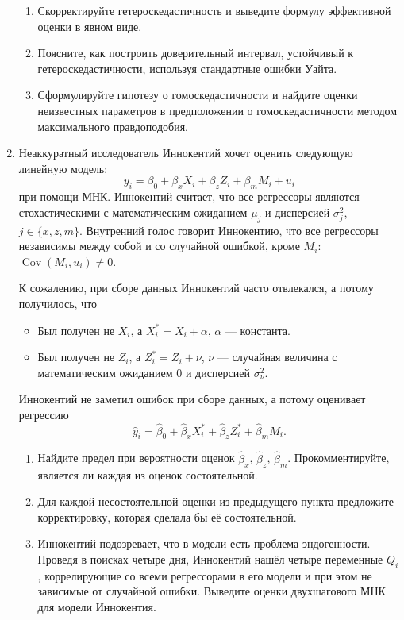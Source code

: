 \documentclass[12pt]{article}
\DeclareMathOperator{\Cov}{Cov}
\DeclareMathOperator{\cov}{\Cov}
\begin{document}
\begin{enumerate}
\begin{enumerate}[label = \alph*)]
	\item Скорректируйте гетероскедастичность и выведите формулу эффективной оценки в явном виде. 
	\item Поясните, как построить доверительный интервал, устойчивый к гетероскедастичности, используя стандартные ошибки Уайта.
	\item Сформулируйте гипотезу о гомоскедастичности и найдите оценки неизвестных параметров в предположении о гомоскедастичности методом максимального правдоподобия.
\end{enumerate}


\newpage
	
	\item Неаккуратный исследователь Иннокентий хочет оценить следующую линейную модель:
	\[
	y_i = \beta_0 + \beta_{x}X_{i} + \beta_zZ_{i} + \beta_mM_{i} + u_i
	\]
	при помощи МНК. Иннокентий считает, что все регрессоры являются стохастическими с математическим ожиданием $\mu_j$ и дисперсией $\sigma^2_j$, $j \in \{x, z, m\}$. Внутренний голос говорит Иннокентию, что все регрессоры независимы между собой и со случайной ошибкой, кроме $M_i$: $\cov(M_i, u_i) \ne 0$.
	
	К сожалению, при сборе данных Иннокентий часто отвлекался, а потому получилось, что
	\begin{itemize}
		\item Был получен не $X_i$, а $X_i^* = X_i + \alpha$, $\alpha$ — константа.
		\item Был получен не $Z_i$, а $Z_i^* = Z_i + \nu$, $\nu$ — случайная величина с математическим ожиданием 0 и дисперсией $\sigma^2_{\nu}$.
	\end{itemize}

	Иннокентий не заметил ошибок при сборе данных, а потому оценивает регрессию
	\[
	\hat{y}_i = \hat{\beta}_0 + \hat{\beta}_{x}X^*_{i} + \hat{\beta}_zZ^*_{i} + \hat{\beta}_mM_{i}.
	\]
	
	\begin{enumerate}[label = \alph*)]
		\item Найдите предел при вероятности оценок $\hat{\beta}_{x}$, $\hat{\beta}_{z}$, $\hat{\beta}_{m}$. Прокомментируйте, является ли каждая из оценок состоятельной.
		\item Для каждой несостоятельной оценки из предыдущего пункта предложите корректировку, которая сделала бы её состоятельной.
		\item Иннокентий подозревает, что в модели есть проблема эндогенности. Проведя в поисках четыре дня, Иннокентий нашёл четыре переменные $Q_i$, коррелирующие со всеми регрессорами в его модели и при этом не зависимые от случайной ошибки. Выведите оценки двухшагового МНК для модели Иннокентия.
	\end{enumerate}


\end{enumerate}
\end{document}
